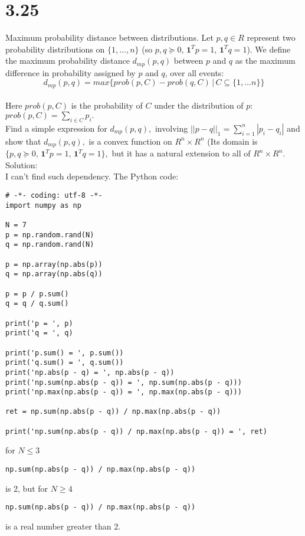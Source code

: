 \documentclass{article}
\begin{document}
\section*{3.25}
Maximum probability distance between distributions. 
Let $p, q \in R $ represent two probability
distributions on $\{1, ..., n\}$ 
(so $p, q \succeq 0, \, \boldsymbol{1}^T p = 1, \, \boldsymbol{1}^T q = 1$). We define the maximum
probability distance $d_{mp}(p, q)$ between $p$ and $q$ as the maximum difference in probability assigned by $p$ and $q$, over all events: \\
$$d_{mp}(p, q) = max\{prob(p, C) - prob(q, C) \, | 
\, C \subseteq \{1, ... n\} \} $$ \\
Here $prob(p, C)$ is the probability of $C$ under the distribution of $p$: \\
$prob(p, C) = \sum_{i \in C} p_i.$\\
Find a simple expression for $d_{mp}(p, q),$ involving 
$||p - q||_1 = \sum_{i = 1}^{n} |p_i - q_i|$ and show that
$d_{mp}(p, q),$ is a convex function on $R^n \times R^n$
(Its domain is \\
$\{p, q \succeq 0, \, \boldsymbol{1}^T p = 1, \, \boldsymbol{1}^T q = 1\},$ but
it has a natural extension to all of $R^n \times R^n.$ \\
Solution: \\

I can't find such dependency. The Python code:
\begin{verbatim}
# -*- coding: utf-8 -*-
import numpy as np

N = 7
p = np.random.rand(N)
q = np.random.rand(N)

p = np.array(np.abs(p))
q = np.array(np.abs(q))

p = p / p.sum()
q = q / q.sum()

print('p = ', p)
print('q = ', q)

print('p.sum() = ', p.sum())
print('q.sum() = ', q.sum())
print('np.abs(p - q) = ', np.abs(p - q))
print('np.sum(np.abs(p - q)) = ', np.sum(np.abs(p - q)))
print('np.max(np.abs(p - q)) = ', np.max(np.abs(p - q))) 

ret = np.sum(np.abs(p - q)) / np.max(np.abs(p - q))

print('np.sum(np.abs(p - q)) / np.max(np.abs(p - q)) = ', ret)     
\end{verbatim}
for $N \leq 3$ 
\begin{verbatim}
np.sum(np.abs(p - q)) / np.max(np.abs(p - q))
\end{verbatim} 
is 2, but for $N \geq 4$ 
\begin{verbatim}
np.sum(np.abs(p - q)) / np.max(np.abs(p - q))
\end{verbatim} 
is a real number greater than 2.
\end{document}
